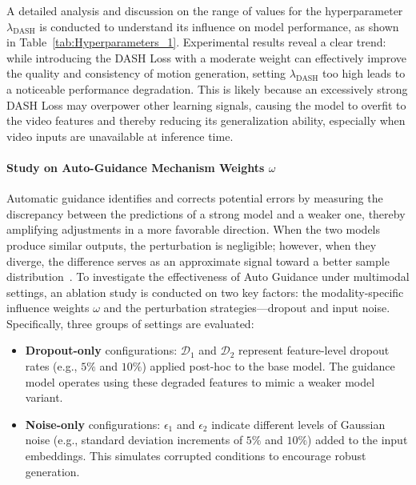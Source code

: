 \documentclass[a4paper,12pt]{article}
\begin{document}
A detailed analysis and discussion on the range of values for the hyperparameter $\lambda_{\text{DASH}}$ is conducted to understand its influence on model performance, as shown in Table~\ref{tab:Hyperparameters_1}. Experimental results reveal a clear trend: while introducing the DASH Loss with a moderate weight can effectively improve the quality and consistency of motion generation, setting $\lambda_{\text{DASH}}$ too high leads to a noticeable performance degradation. This is likely because an excessively strong DASH Loss may overpower other learning signals, causing the model to overfit to the video features and thereby reducing its generalization ability, especially when video inputs are unavailable at inference time.


\paragraph{Study on Auto-Guidance Mechanism Weights $\omega$}
Automatic guidance identifies and corrects potential errors by measuring the discrepancy between the predictions of a strong model and a weaker one, thereby amplifying adjustments in a more favorable direction. When the two models produce similar outputs, the perturbation is negligible; however, when they diverge, the difference serves as an approximate signal toward a better sample distribution~\cite{karras2024guiding}. To investigate the effectiveness of Auto Guidance under multimodal settings, an ablation study is conducted on two key factors: the modality-specific influence weights $\omega$ and the perturbation strategies—dropout and input noise. Specifically, three groups of settings are evaluated:

\begin{itemize}
    \item \textbf{Dropout-only} configurations: $\mathcal{D}_1$ and $\mathcal{D}_2$ represent feature-level dropout rates (e.g., $5\%$ and $10\%$) applied post-hoc to the base model. The guidance model operates using these degraded features to mimic a weaker model variant.
    
    \item \textbf{Noise-only} configurations: $\epsilon_1$ and $\epsilon_2$ indicate different levels of Gaussian noise (e.g., standard deviation increments of $5\%$ and $10\%$) added to the input embeddings. This simulates corrupted conditions to encourage robust generation.
    
\end{itemize}
\end{document}
